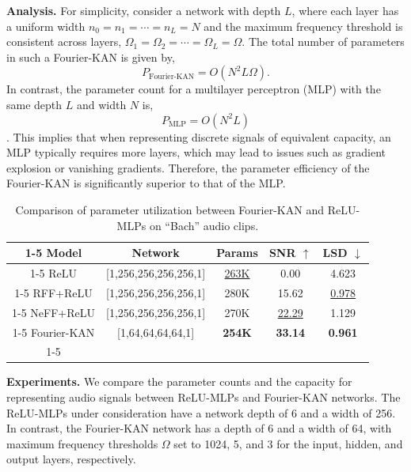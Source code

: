 \documentclass[letterpaper]{article} %
\newcommand{\fs}{\bf}   %
\begin{document}
\textbf{Analysis.} 
For simplicity, consider a network with depth \(L\), where each layer has a uniform width \(n_0 = n_1 = \cdots = n_L = N\) and the maximum frequency threshold is consistent across layers, \(\Omega_1 = \Omega_2 = \cdots = \Omega_L = \Omega\). The total number of parameters in such a Fourier-KAN is given by,
\[
P_{\text{Fourier-KAN}} = O(N^2 L\Omega).
\]
In contrast, the parameter count for a multilayer perceptron (MLP) with the same depth \(L\) and width \(N\) is,
\[
P_{\text{MLP}} = O(N^2 L)
\].
This implies that when representing discrete signals of equivalent capacity, an MLP typically requires more layers, which may lead to issues such as gradient explosion or vanishing gradients. Therefore, the parameter efficiency of the Fourier-KAN is significantly superior to that of the MLP.

\begin{table}[!htbp]
  \centering
  \tabcolsep=1.0mm
   \fontsize{9}{11}\selectfont
  \begin{tabular}{ccccc}
    \cline{1-5}
     Model &  Network & Params & SNR $\uparrow$ & LSD $\downarrow$ \\
     
    \cline{1-5}
    ReLU & [1,256,256,256,256,1] & \underline{ 263K} & 0.00 & 4.623 \\

    \cline{1-5}
    RFF+ReLU & [1,256,256,256,256,1] & 280K & 15.62 & \underline{ 0.978} \\

     \cline{1-5}
    NeFF+ReLU & [1,256,256,256,256,1] & 270K & \underline{ 22.29} & 1.129 \\

      \cline{1-5}
    Fourier-KAN & [1,64,64,64,64,1] & \fs 254K & \fs 33.14 & \fs 0.961 \\
  \cline{1-5}
  \end{tabular}
 \caption{Comparison of parameter utilization between Fourier-KAN and ReLU-MLPs on ``Bach'' audio clips.}
  \label{tab:parameter_usage}
\end{table}

\textbf{Experiments. } 
We compare the parameter counts and the capacity for representing audio signals between ReLU-MLPs and Fourier-KAN networks. The ReLU-MLPs under consideration have a network depth of 6 and a width of 256. In contrast, the Fourier-KAN network has a depth of 6 and a width of 64, with maximum frequency thresholds \(\Omega\) set to 1024, 5, and 3 for the input, hidden, and output layers, respectively.
\end{document}
